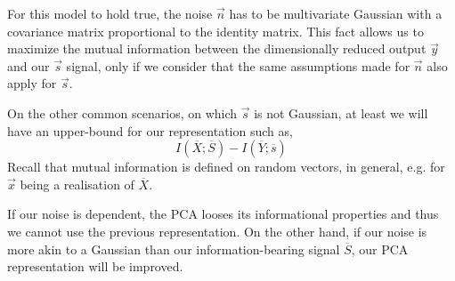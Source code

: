 For this model to hold true, the noise $\vec n$ has to be multivariate Gaussian with a covariance matrix proportional to the identity matrix. This fact allows us to maximize the mutual information between the dimensionally reduced output $\vec y$ and our $\vec s$ signal, only if we consider that the same assumptions made for $\vec n$ also apply for $\vec s$. \par

On the other common scenarios, on which $\vec s$ is not Gaussian, at least we will have an upper-bound for our representation such as,
%
\begin{equation}
\label{eq:pca_upper_bound}
I(\overline X; \overline S) - I(\overline Y; \overline s)
\end{equation}
\noindent
Recall that mutual information is defined on random vectors, in general, e.g. for $\vec x$ being a realisation of $\overline X$.


If our noise is dependent, the PCA looses its informational properties and thus we cannot use the previous representation. On the other hand, if our noise is more akin to a Gaussian than our information-bearing signal $\overline S$, our PCA representation will be improved.

